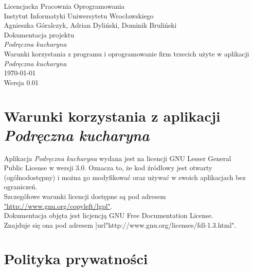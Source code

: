 \documentclass[12pt,leqno, twoside]{mwart}
\begin{document}
\thispagestyle{empty}
\begin{center}
Licencjacka Pracownia Oprogramowania \\ Instytut
Informatyki Uniwersytetu Wrocławskiego \\
\vspace{4cm}
\Large Agnieszka Góralczyk, Adrian Dyliński, Dominik Bruliński \\
\vspace{0.5cm}
\huge Dokumentacja projektu\\ \emph{Podręczna kucharyna}\\ \Large Warunki korzystania z programu i oprogramowanie firm trzecich użyte w aplikacji \emph{Podręczna kucharyna} \\
\vspace{1cm}
\normalsize \today \\
\vspace{2cm}
\normalsize Wersja 0.01
\end{center}

\newpage
\usepackage{hyperref}
\section{Warunki korzystania z aplikacji \emph{Podręczna kucharyna} }
Aplikacja \emph{Podręczna kucharyna} wydana jest na licencji GNU Lesser General Public License w wersji 3.0.
Oznacza to, że kod źródłowy jest otwarty (ogólnodostępny) i można go modyfikować oraz używać w swoich aplikacjach bez ograniczeń. \\
Szczegółowe warunki licencji dostępne są pod adresem \url{"http://www.gnu.org/copyleft/lgpl"}. \\

Dokumentacja objęta jest licjencją GNU Free Documentation License. \\
Znajduje się ona pod adresem ]url{"http://www.gnu.org/licenses/fdl-1.3.html"}.
\section{Polityka prywatności}
\end{document}

